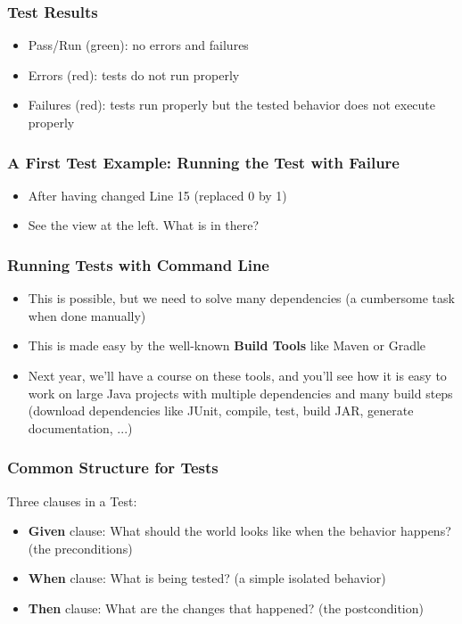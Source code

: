 \documentclass{beamer}
\begin{document}
\begin{frame}
\frametitle{Test Results}

  \begin{itemize}
  \item Pass/Run (green): no errors and failures
  \item Errors (red): tests do not run properly    
  \item Failures (red): tests run properly but the tested behavior does
    not execute properly
  \end{itemize}
  
\end{frame}

\begin{frame}
\frametitle{A First Test Example: Running the Test with Failure}
  \begin{itemize}
  \item After having changed Line 15 (replaced 0 by 1) \vspace{4.5cm}
  \item See the view at the left. What is in there?
  \end{itemize}  
\end{frame}

\begin{frame}
\frametitle{Running Tests with Command Line}
\begin{itemize}
\item This is possible, but we need to solve many dependencies (a
  cumbersome task when done manually)
\item This is made easy by the well-known \textbf{Build Tools} like
  Maven or Gradle
\item Next year, we'll have a course on these tools, and you'll see
  how it is easy to work on large Java projects with multiple
  dependencies and many build steps (download dependencies like JUnit,
  compile, test, build JAR, generate documentation, ...)
\end{itemize}
\end{frame}

\begin{frame}
  \frametitle{Common Structure for Tests}
  Three clauses in a Test:
\begin{itemize}
\item \textbf{Given} clause: What should the world looks like when the
  behavior happens? (the preconditions)
\item \textbf{When} clause: What is being tested? (a simple isolated
  behavior)
\item \textbf{Then} clause: What are the changes that happened? (the
  postcondition)
\end{itemize}
\end{frame}
\end{document}
